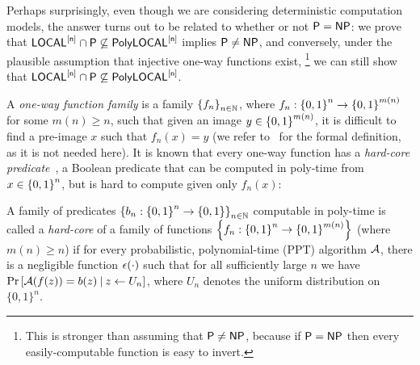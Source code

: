 Perhaps surprisingly,
even though we are considering deterministic computation models,
the answer turns out to be related to whether or not ${\mathsf{P}} = {\mathsf{NP}}$:
we prove that
${\mathsf{LOCAL}}^{[\mathsf{n}]} \cap {\mathsf{P}} \not \subseteq \mathsf{PolyLOCAL}^{[\mathsf{n}]}$ implies ${\mathsf{P}} \neq {\mathsf{NP}}$,
and conversely, under the plausible assumption that injective one-way functions exist,%
\footnote{This is stronger than assuming that ${\mathsf{P}} \neq {\mathsf{NP}}$,
because if ${\mathsf{P}} = {\mathsf{NP}}$ then every easily-computable function is easy to invert.}
we can still show that 
${\mathsf{LOCAL}}^{[\mathsf{n}]} \cap {\mathsf{P}} \not \subseteq \mathsf{PolyLOCAL}^{[\mathsf{n}]}$.

A \emph{one-way function family} is a family $\left \{{ f_n } \right \}_{n \in \mathbb{N}}$,
where $f_n : \left \{{0,1} \right \}^n \rightarrow \left \{{0,1} \right \}^{m(n)}$ for some $m(n) \geq n$,
such that given an image $y \in \left \{{0,1} \right \}^{m(n)}$,
it is difficult to find a pre-image $x$ such that $f_n(x) = y$ (we refer to~\cite{OdedBook} for the formal definition,
as it is not needed here).
It is known that every one-way function has a \emph{hard-core predicate}~\cite{GL89},
a Boolean predicate that can be computed in poly-time from $x \in \left \{{0,1} \right \}^n$,
but is hard to compute given only $f_n(x)$:
\begin{definition}\label{def:HCP}
	A family of predicates %
 $ \left \{{ b_n : \left \{{0,1} \right \}^n \rightarrow \left \{{0,1} \right \}} \right \}_{n \in \mathbb{N}}$
computable in poly-time
 is called a \emph{hard-core} of a
	family of functions $\left \{{ f_n : \left \{{0,1} \right \}^n \rightarrow \left \{{0,1} \right \}^{m(n)}} \right \}$ (where $m(n) \geq n$)
	if for every probabilistic, polynomial-time (PPT) algorithm $\mathcal{A}$, there is a negligible function $\epsilon(\cdot)$ such that
	for all sufficiently large $n$ we have
	$\Pr\left[ \mathcal{A}( f(z) ) = b(z) \medspace | \medspace z \leftarrow U_n \right]$,
where $U_n$ denotes the uniform distribution on $\{0,1\}^n$.
\end{definition}

